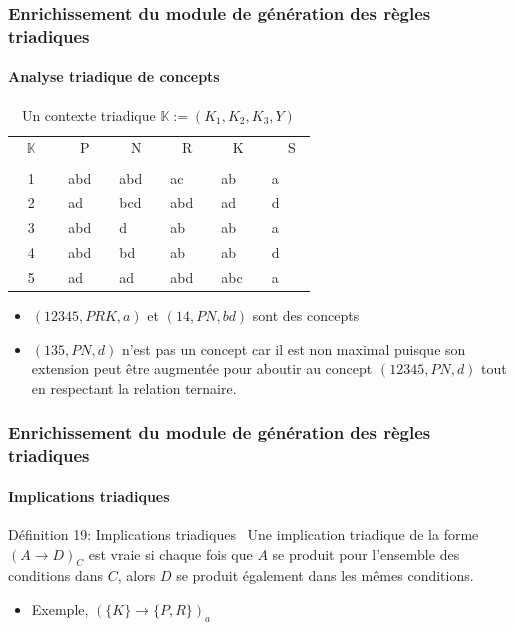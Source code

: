 \documentclass[french]{beamer}
\def\KK{\mathbb{K}}
\begin{document}
\begin{frame}
\frametitle{Enrichissement du module de génération des règles triadiques}
\framesubtitle{Analyse triadique de concepts}
\begin{table}[H]
\scriptsize
\begin{center}
\begin{tabular}{|c| p{20pt} | p{20pt} | p{20pt} | p{20pt} | p{20pt} |}\hline
 ~ $\KK$ ~& ~ ~P~ &  ~ ~N~ & ~ ~R~  &  ~ ~K~ & ~ ~ S~  \\
 &  &  &  &   &   \\ \hline
1 & ~abd~ & ~abd~ & ~ac~ & ~ab~ & ~a~  \\
2 & ~ad~ & ~bcd~ & ~abd~ & ~ad~ & ~d ~ \\
3 & ~abd~ & ~d~ & ~ab~ & ~ab~ & ~a~  \\
4 & ~abd~  & ~bd~ & ~ab~ & ~ab~ & ~d~ \\
5 & ~ad~  & ~ad~ & ~abd~ & ~abc~ & ~a~ \\\hline
\end{tabular}
\caption{Un contexte triadique $\KK:=(K_1, K_2, K_3, Y)$}
\label{Tab:TC}
\end{center}
 \begin{itemize}
   \item $(12345,PRK, a)$ et $(14, PN, bd)$ sont des concepts
   \item $(135, PN, d)$ n'est pas un concept car il est non maximal puisque son extension peut être augmentée pour aboutir au concept $(12345, PN, d)$ tout en respectant la relation ternaire.
 \end{itemize}
\end{table}
\end{frame}
\begin{frame}
\frametitle{Enrichissement du module de génération des règles triadiques}
\framesubtitle{Implications triadiques}
\begin{block}{Définition 19: Implications triadiques~\parencite{Biedermann1997}}
Une implication triadique de la forme $(A \rightarrow D)_C$ est vraie si chaque fois que $A$ se produit pour l'ensemble des conditions dans $C$, alors $D$ se produit également dans les mêmes conditions. 
\end{block}
\begin{itemize}
  \item Exemple, $(\{K\} \rightarrow \{P,R\})_a$
\end{itemize}
\end{frame}
\end{document}
